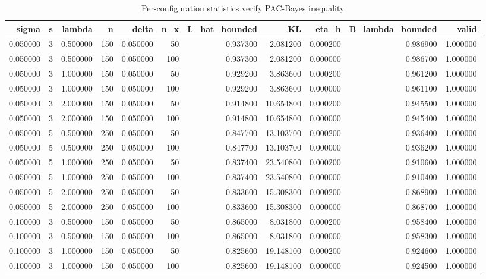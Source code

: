 \begin{table}
\caption{Per-configuration statistics verify PAC-Bayes inequality}
\label{tab:per_config_stats}
\begin{tabular}{rrrrrrrrrrr}
\toprule
sigma & s & lambda & n & delta & n_x & L_hat_bounded & KL & eta_h & B_lambda_bounded & valid \\
\midrule
0.050000 & 3 & 0.500000 & 150 & 0.050000 & 50 & 0.937300 & 2.081200 & 0.000200 & 0.986900 & 1.000000 \\
0.050000 & 3 & 0.500000 & 150 & 0.050000 & 100 & 0.937300 & 2.081200 & 0.000000 & 0.986700 & 1.000000 \\
0.050000 & 3 & 1.000000 & 150 & 0.050000 & 50 & 0.929200 & 3.863600 & 0.000200 & 0.961200 & 1.000000 \\
0.050000 & 3 & 1.000000 & 150 & 0.050000 & 100 & 0.929200 & 3.863600 & 0.000000 & 0.961100 & 1.000000 \\
0.050000 & 3 & 2.000000 & 150 & 0.050000 & 50 & 0.914800 & 10.654800 & 0.000200 & 0.945500 & 1.000000 \\
0.050000 & 3 & 2.000000 & 150 & 0.050000 & 100 & 0.914800 & 10.654800 & 0.000000 & 0.945400 & 1.000000 \\
0.050000 & 5 & 0.500000 & 250 & 0.050000 & 50 & 0.847700 & 13.103700 & 0.000200 & 0.936400 & 1.000000 \\
0.050000 & 5 & 0.500000 & 250 & 0.050000 & 100 & 0.847700 & 13.103700 & 0.000000 & 0.936200 & 1.000000 \\
0.050000 & 5 & 1.000000 & 250 & 0.050000 & 50 & 0.837400 & 23.540800 & 0.000200 & 0.910600 & 1.000000 \\
0.050000 & 5 & 1.000000 & 250 & 0.050000 & 100 & 0.837400 & 23.540800 & 0.000000 & 0.910400 & 1.000000 \\
0.050000 & 5 & 2.000000 & 250 & 0.050000 & 50 & 0.833600 & 15.308300 & 0.000200 & 0.868900 & 1.000000 \\
0.050000 & 5 & 2.000000 & 250 & 0.050000 & 100 & 0.833600 & 15.308300 & 0.000000 & 0.868700 & 1.000000 \\
0.100000 & 3 & 0.500000 & 150 & 0.050000 & 50 & 0.865000 & 8.031800 & 0.000200 & 0.958400 & 1.000000 \\
0.100000 & 3 & 0.500000 & 150 & 0.050000 & 100 & 0.865000 & 8.031800 & 0.000000 & 0.958300 & 1.000000 \\
0.100000 & 3 & 1.000000 & 150 & 0.050000 & 50 & 0.825600 & 19.148100 & 0.000200 & 0.924600 & 1.000000 \\
0.100000 & 3 & 1.000000 & 150 & 0.050000 & 100 & 0.825600 & 19.148100 & 0.000000 & 0.924500 & 1.000000 \\

\end{tabular}
\end{table}
